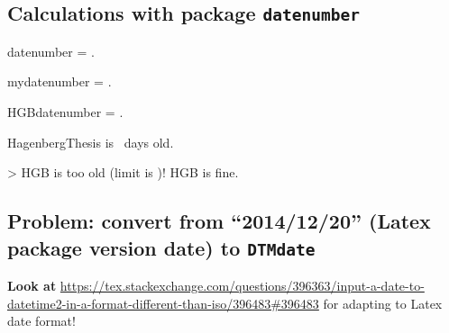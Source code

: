 \documentclass[german,notitlepage,smartquotes,noUpdateCheck]{hgbreport}
\begin{document}
\subsection*{Calculations with package \texttt{datenumber}}

\noindent
datenumber = \thedatenumber.

\noindent
mydatenumber = \themydatenumber.


\noindent
HGBdatenumber = \theHGBdatenumber.

%
%

%
%
\addtocounter{dateAge}{-\thedateHgb}%

\noindent
HagenbergThesis is \thedateAge\ days old.

\setcounter{ageLimit}{6}

\noindent
\ifnum\value{dateAge}>\value{ageLimit}%
     HGB is too old (limit is )!%
    \else 
      HGB is fine.%
    \fi







\subsection*{Problem: convert from ``2014/12/20'' (Latex package version date) to \texttt{DTMdate}}

\noindent
\textbf{Look at} \url{https://tex.stackexchange.com/questions/396363/input-a-date-to-datetime2-in-a-format-different-than-iso/396483#396483}
for adapting to Latex date format!
\end{document}
